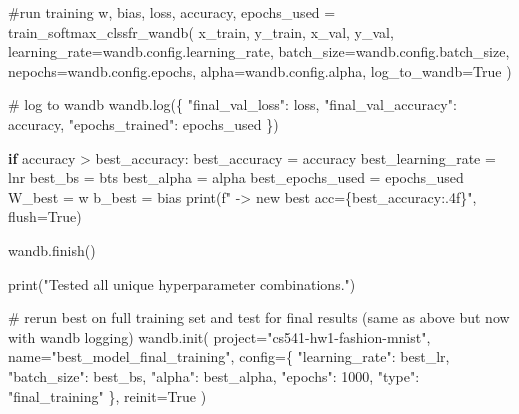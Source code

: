 \documentclass[
  letterpaper,
  DIV=11,
  numbers=noendperiod]{scrartcl}
\newenvironment{Shaded}{\begin{snugshade}}{\end{snugshade}}
\newcommand{\BuiltInTok}[1]{\textcolor[rgb]{0.00,0.23,0.31}{#1}}
\newcommand{\CommentTok}[1]{\textcolor[rgb]{0.37,0.37,0.37}{#1}}
\newcommand{\ControlFlowTok}[1]{\textcolor[rgb]{0.00,0.23,0.31}{\textbf{#1}}}
\newcommand{\DecValTok}[1]{\textcolor[rgb]{0.68,0.00,0.00}{#1}}
\newcommand{\NormalTok}[1]{\textcolor[rgb]{0.00,0.23,0.31}{#1}}
\newcommand{\OperatorTok}[1]{\textcolor[rgb]{0.37,0.37,0.37}{#1}}
\newcommand{\SpecialCharTok}[1]{\textcolor[rgb]{0.37,0.37,0.37}{#1}}
\newcommand{\SpecialStringTok}[1]{\textcolor[rgb]{0.13,0.47,0.30}{#1}}
\newcommand{\StringTok}[1]{\textcolor[rgb]{0.13,0.47,0.30}{#1}}
\newcommand{\VariableTok}[1]{\textcolor[rgb]{0.07,0.07,0.07}{#1}}
\begin{document}
\begin{Shaded}
\begin{Highlighting}[]
                \CommentTok{\#run training}
\NormalTok{                w, bias, loss, accuracy, epochs\_used }\OperatorTok{=}\NormalTok{ train\_softmax\_clssfr\_wandb(}
\NormalTok{                  x\_train, y\_train, x\_val, y\_val,}
\NormalTok{                  learning\_rate}\OperatorTok{=}\NormalTok{wandb.config.learning\_rate,}
\NormalTok{                  batch\_size}\OperatorTok{=}\NormalTok{wandb.config.batch\_size,}
\NormalTok{                  nepochs}\OperatorTok{=}\NormalTok{wandb.config.epochs, }
\NormalTok{                  alpha}\OperatorTok{=}\NormalTok{wandb.config.alpha,}
\NormalTok{                  log\_to\_wandb}\OperatorTok{=}\VariableTok{True}
\NormalTok{               )}

                \CommentTok{\# log to wandb}
\NormalTok{                wandb.log(\{}
                  \StringTok{"final\_val\_loss"}\NormalTok{: loss,}
                  \StringTok{"final\_val\_accuracy"}\NormalTok{: accuracy,}
                  \StringTok{"epochs\_trained"}\NormalTok{: epochs\_used}
\NormalTok{                \})}
                
                \ControlFlowTok{if}\NormalTok{ accuracy }\OperatorTok{\textgreater{}}\NormalTok{ best\_accuracy:}
\NormalTok{                  best\_accuracy }\OperatorTok{=}\NormalTok{ accuracy}
\NormalTok{                  best\_learning\_rate }\OperatorTok{=}\NormalTok{ lnr}
\NormalTok{                  best\_bs }\OperatorTok{=}\NormalTok{ bts}
\NormalTok{                  best\_alpha }\OperatorTok{=}\NormalTok{ alpha}
\NormalTok{                  best\_epochs\_used }\OperatorTok{=}\NormalTok{ epochs\_used}
\NormalTok{                  W\_best }\OperatorTok{=}\NormalTok{ w}
\NormalTok{                  b\_best }\OperatorTok{=}\NormalTok{ bias}
                  \BuiltInTok{print}\NormalTok{(}\SpecialStringTok{f" {-}\textgreater{} new best acc=}\SpecialCharTok{\{}\NormalTok{best\_accuracy}\SpecialCharTok{:.4f\}}\SpecialStringTok{"}\NormalTok{, flush}\OperatorTok{=}\VariableTok{True}\NormalTok{)}
               
\NormalTok{                wandb.finish()}

\BuiltInTok{print}\NormalTok{(}\StringTok{"Tested all unique hyperparameter combinations."}\NormalTok{)}

\CommentTok{\# rerun best on full training set and test for final results (same as above but now with wandb logging)}
\NormalTok{wandb.init(}
\NormalTok{   project}\OperatorTok{=}\StringTok{"cs541{-}hw1{-}fashion{-}mnist"}\NormalTok{,}
\NormalTok{   name}\OperatorTok{=}\StringTok{"best\_model\_final\_training"}\NormalTok{,}
\NormalTok{   config}\OperatorTok{=}\NormalTok{\{}
      \StringTok{"learning\_rate"}\NormalTok{: best\_lr,}
      \StringTok{"batch\_size"}\NormalTok{: best\_bs,}
      \StringTok{"alpha"}\NormalTok{: best\_alpha,}
      \StringTok{"epochs"}\NormalTok{: }\DecValTok{1000}\NormalTok{,}
      \StringTok{"type"}\NormalTok{: }\StringTok{"final\_training"}
\NormalTok{   \},}
\NormalTok{   reinit}\OperatorTok{=}\VariableTok{True}
\NormalTok{)}


\end{Highlighting}
\end{Shaded}
\end{document}
